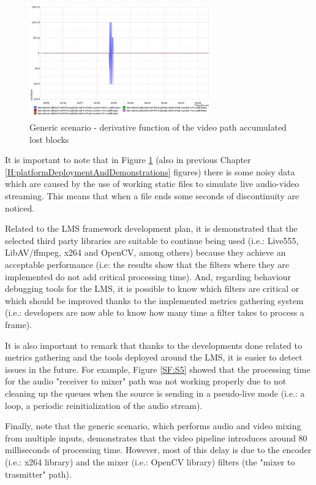 \begin{figure}[!htb]
\begin{center}
\includegraphics[width=0.70\textwidth]{./images/testAVMix/AVMixVideoLostBlocsDerivative.png}
\caption{Generic scenario - derivative function of the video path accumulated lost blocks}
\label{F:gsvpalbd}
\end{center}
\end{figure}

It is important to note that in Figure \ref{F:gsvpalbd} (also in previous Chapter \ref{H:platformDeploymentAndDemonstrations} figures) there is some noisy data which are caused by the use of working static files to simulate live audio-video streaming. This means that when a file ends some seconds of discontinuity are noticed.

Related to the LMS framework development plan, it is demonstrated that the selected third party libraries are suitable to continue being used (i.e.: Live555, LibAV/ffmpeg, x264 and OpenCV, among others) because they achieve an acceptable performance (i.e: the results show that the filters where they are implemented do not add critical processing time). And, regarding behaviour debugging tools for the LMS, it is possible to know which filters are critical or which should be improved thanks to the implemented metrics gathering system (i.e.: developers are now able to know how many time a filter takes to process a frame).

It is also important to remark that thanks to the developments done related to metrics gathering and the tools deployed around the LMS, it is easier to detect issues in the future. For example, Figure \ref{SF:S5} showed that the processing time for the audio "receiver to mixer" path was not working properly due to not cleaning up the queues when the source is sending in a pseudo-live mode (i.e.: a loop, a periodic reinitialization of the audio stream).

Finally, note that the generic scenario, which performs audio and video mixing from multiple inputs, demonstrates that the video pipeline introduces around 80 milliseconds of processing time. However, most of this delay is due to the encoder (i.e.: x264 library) and the mixer (i.e.: OpenCV library) filters (the "mixer to trasmitter" path).

